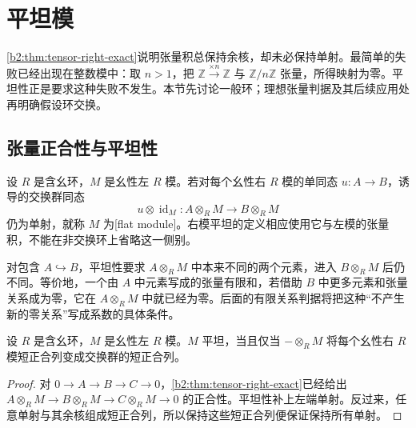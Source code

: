 
\section{平坦模}
\label{b2:sec:0703}

\cref{b2:thm:tensor-right-exact}说明张量积总保持余核，却未必保持单射。最简单的失败已经出现在整数模中：取 \(n>1\)，把 \(\mathbb Z\xrightarrow{\times n}\mathbb Z\) 与 \(\mathbb Z/n\mathbb Z\) 张量，所得映射为零。平坦性正是要求这种失败不发生。本节先讨论一般环；理想张量判据及其后续应用处再明确假设环交换。

%
%

\subsection{张量正合性与平坦性}
\label{b2:subsec:0703:01}

\begin{definition}\label{b2:def:flat-module}
	设 \(R\) 是含幺环，\(M\) 是幺性左 \(R\) 模。若对每个幺性右 \(R\) 模的单同态 \(u:A\to B\)，诱导的交换群同态
	\[
		u\otimes\operatorname{id}_M:A\otimes_R M\longrightarrow B\otimes_R M
	\]
	仍为单射，就称 \(M\) 为[flat module]。右模平坦的定义相应使用它与左模的张量积，不能在非交换环上省略这一侧别。
\end{definition}

对包含 \(A\hookrightarrow B\)，平坦性要求 \(A\otimes_RM\) 中本来不同的两个元素，进入 \(B\otimes_RM\) 后仍不同。等价地，一个由 \(A\) 中元素写成的张量有限和，若借助 \(B\) 中更多元素和张量关系成为零，它在 \(A\otimes_RM\) 中就已经为零。后面的有限关系判据将把这种“不产生新的零关系”写成系数的具体条件。

\begin{proposition}\label{b2:prop:flat-exact}
	设 \(R\) 是含幺环，\(M\) 是幺性左 \(R\) 模。\(M\) 平坦，当且仅当 \(-\otimes_R M\) 将每个幺性右 \(R\) 模短正合列变成交换群的短正合列。
\end{proposition}
\begin{proof}
	对 \(0\to A\to B\to C\to0\)，\cref{b2:thm:tensor-right-exact}已经给出 \(A\otimes_R M\to B\otimes_R M\to C\otimes_R M\to0\) 的正合性。平坦性补上左端单射。反过来，任意单射与其余核组成短正合列，所以保持这些短正合列便保证保持所有单射。
\end{proof}

